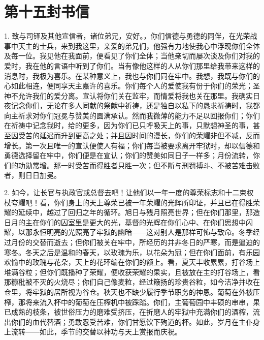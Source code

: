 

\section{第十五封书信}

\par

\par

1. 致与司铎及其他宣信者，诸位弟兄，安好。，你们信德与勇德的同伴，在光荣战事中天主的士兵，来到我这里，亲爱的弟兄们，他强有力地使我心中浮现你们全体及每一位。我见他在我面前，便看见了你们全体；当他亲切而屡次谈及你们对我的爱时，我在他的言语中听到了你们。当有像他这样的人从你们那里给我带来这样的消息时，我极为喜乐。在某种意义上，我也与你们同在牢中。我想，我既与你们的心如此相连，便同享天主嘉许的喜乐。你们每个人的爱使我有份于你们的荣光；圣神不允许我们的爱分离。宣认将你们关在监牢，而情爱将我也关在那里。我确实日夜记念你们，无论在多人同献的祭献中祈祷，还是独自以私下的恳求祈祷时，我都向主祈求对你们冠冕与赞美的圆满承认。然而我微薄的能力不足以回报你们；你们在祈祷中记念我时，给的更多，因为你们已只呼吸天上的事，只默想神圣的事，甚至因受苦的延迟而升到更高之处；并且因时间的漫长，你们的荣耀非但不减，反而增长。第一次且唯一的宣认便使人有福；你们每当被要求离开牢狱时，却以信德和勇德选择留在牢中，你们便是在宣认；你们的赞美如同日子一样多；月份流转，你们的功勋常增。那一时受苦而得胜者只胜一次；但不断与刑罚搏斗、不被苦难击败者，则日日加冕。\par

2. 如今，让长官与执政官或总督去吧！让他们以一年一度的尊荣标志和十二束权杖夸耀吧！看，你们身上的天上尊荣已被一年荣耀的光辉所印证，并且已在得胜荣耀的延续中，越过了回归之年的循环。旭日与残月照亮世界；但在你们那里，那造日月的主在你们的囚室里是更大的光，基督的光辉在你们心中、在你们思想中闪耀，以那永恒明亮的光照亮了牢狱的幽暗——这对别人是那样可怖与致命。冬季经过月份的交替而逝去；但你们被关在牢中，所经历的并非冬日的严寒，而是逼迫的寒冬。冬天之后是温和的春天，以玫瑰为乐，以花朵为冠；但在你们面前，有乐园欢愉中的玫瑰与花朵，天上的花环编在你们的额上。看，夏天丰收累累，打谷场上堆满谷粒；但你们既播种了荣耀，便收获荣耀的果实，且被放在主的打谷场上，看那糠秕被不灭的火烧尽；你们自己像麦粒，经过簸扬的珍贵谷粒，如今洁净并收在仓里，将牢狱的居所视为谷仓。秋天也不缺少履行季节职务的神恩。葡萄在外被压榨，那将来流入杯中的葡萄在压榨机中被踩踏。你们，主葡萄园中丰硕的串串，果已成熟的枝条，被世俗压力的磨难受挤压，在折磨人的牢狱中充满你们的酒榨，流出你们的血代替酒；勇敢忍受苦难，你们甘愿饮下殉道的杯。如此，岁月在主仆身上流转——如此，季节的交替以神功与天上赏报而庆祝。\par

